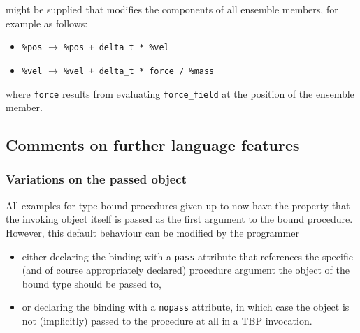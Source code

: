 \documentclass[
  paper=a4,
  ,captions=tableheading
]{scrartcl}
\providecommand{\tightlist}{%
  \setlength{\itemsep}{0pt}\setlength{\parskip}{0pt}}
\begin{document}
might be supplied that modifies the components of all ensemble members,
for example as follows:

\begin{itemize}
\tightlist
\item
  \texttt{\%pos} \(\longrightarrow\)
  \texttt{\%pos\ +\ delta\_t\ *\ \%vel}
\item
  \texttt{\%vel} \(\longrightarrow\)
  \texttt{\%vel\ +\ delta\_t\ *\ force\ /\ \%mass}
\end{itemize}

where \texttt{force} results from evaluating \texttt{force\_field} at
the position of the ensemble member.

\subsection{Comments on further language
features}\label{comments-on-further-language-features}

\subsubsection{Variations on the passed
object}\label{variations-on-the-passed-object}

All examples for type-bound procedures given up to now have the property
that the invoking object itself is passed as the first argument to the
bound procedure. However, this default behaviour can be modified by the
programmer

\begin{itemize}
\tightlist
\item
  either declaring the binding with a \texttt{pass} attribute that
  references the specific (and of course appropriately declared)
  procedure argument the object of the bound type should be passed to,
\item
  or declaring the binding with a \texttt{nopass} attribute, in which
  case the object is not (implicitly) passed to the procedure at all in
  a TBP invocation.
\end{itemize}
\end{document}
